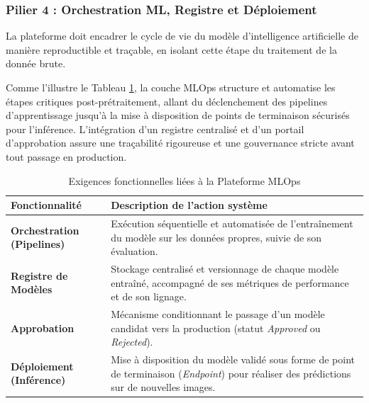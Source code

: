 \subsubsection{Pilier 4 : Orchestration ML, Registre et Déploiement}
La plateforme doit encadrer le cycle de vie du modèle d'intelligence artificielle de manière reproductible et traçable, en isolant cette étape du traitement de la donnée brute.

Comme l'illustre le Tableau \ref{tab:besoins_mlops}, la couche MLOps structure et automatise les étapes critiques post-prétraitement, allant du déclenchement des pipelines d'apprentissage jusqu'à la mise à disposition de points de terminaison sécurisés pour l'inférence. L'intégration d'un registre centralisé et d'un portail d'approbation assure une traçabilité rigoureuse et une gouvernance stricte avant tout passage en production.

\begin{table}[H]
\centering
\caption{Exigences fonctionnelles liées à la Plateforme MLOps}
\label{tab:besoins_mlops}
\renewcommand{\arraystretch}{1.4}
\begin{tabular}{|p{4cm}|p{9.5cm}|}
\hline
\rowcolor{darkgreen!20} \textbf{Fonctionnalité} & \textbf{Description de l'action système} \\ \hline
\textbf{Orchestration (Pipelines)} & Exécution séquentielle et automatisée de l'entraînement du modèle sur les données propres, suivie de son évaluation. \\ \hline
\textbf{Registre de Modèles} & Stockage centralisé et versionnage de chaque modèle entraîné, accompagné de ses métriques de performance et de son lignage. \\ \hline
\textbf{Approbation} & Mécanisme conditionnant le passage d'un modèle candidat vers la production (statut \textit{Approved} ou \textit{Rejected}). \\ \hline
\textbf{Déploiement (Inférence)} & Mise à disposition du modèle validé sous forme de point de terminaison (\textit{Endpoint}) pour réaliser des prédictions sur de nouvelles images. \\ \hline
\end{tabular}
\end{table}




